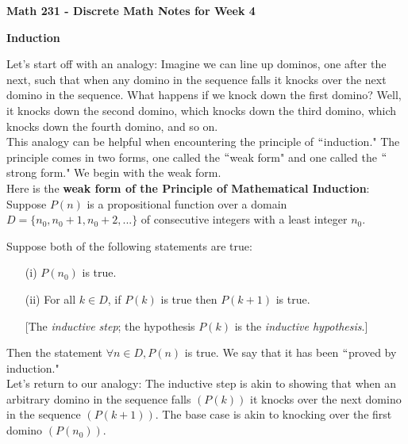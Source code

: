 \documentclass[12pt]{amsart}
\theoremstyle{definition}
\theoremstyle{remark}
\begin{document}
\textbf{Math 231 - Discrete Math \hfill{} Notes for Week 4}

\bigskip
\bigskip

\textbf{Induction}


\bigskip


Let's start off with an analogy:  Imagine we can line up dominos, one after the next, such that when any domino in the sequence falls it knocks over the next domino in the sequence.  What happens if we knock down the first domino?  Well, it knocks down the second domino, which knocks down the third domino, which knocks down the fourth domino, and so on.\\

This analogy can be helpful when encountering the principle of $``$induction."  The principle comes in two forms, one called the $``$weak form" and one called the $``$strong form."  We begin with the weak form.\\


Here is the \textbf{weak form of the Principle of Mathematical Induction}:\\

Suppose $P(n)$ is a propositional function over a domain $D=\{n_{0},n_{0}+1,n_{0}+2,...\}$ of consecutive integers with a least integer $n_{0}$.

\bigskip

Suppose both of the following statements are true:

\bigskip

\begin{enumerate}

\item[(i)]  $P(n_{0})$ is true.


\bigskip

\item[(ii)]  For all $k\in D$, if $P(k)$ is true then $P(k+1)$ is true.

 \medskip

[The \emph{inductive step}; the hypothesis $P(k)$ is the \emph{inductive hypothesis}.]\\

\end{enumerate}

Then the statement $\forall n\in D, P(n)$ is true.  We say that it has been $``$proved by induction."\\

Let's return to our analogy: The inductive step is akin to showing that when an arbitrary domino in the sequence falls $(P(k))$ it knocks over the next domino in the sequence $(P(k+1))$.  The base case is akin to knocking over the first domino $(P(n_0))$.\\ \\
\end{document}
